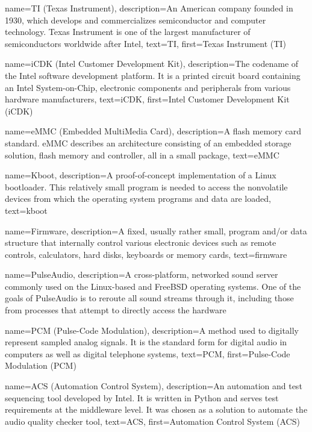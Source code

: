 {
  name=TI (Texas Instrument),
  description={An American company founded in 1930, which develops and
    commercializes semiconductor and computer technology. Texas
    Instrument is one of the largest manufacturer of semiconductors
    worldwide after Intel},
  text=TI,
  first=Texas Instrument (TI)
}

{
  name=iCDK (Intel Customer Development Kit),
  description={The codename of the Intel software development
    platform. It is a printed circuit board containing an Intel
    System-on-Chip, electronic components and peripherals from various
    hardware manufacturers},
  text=iCDK,
  first=Intel Customer Development Kit (iCDK)
}

{
  name=eMMC (Embedded MultiMedia Card),
  description={A flash memory card standard. eMMC describes an
    architecture consisting of an embedded storage solution, flash
    memory and controller, all in a small package},
  text=eMMC
}

{
  name=Kboot,
  description={A proof-of-concept implementation of a Linux
    bootloader. This relatively small program is needed to access the
    nonvolatile devices from which the operating system programs and
    data are loaded},
  text=kboot
}

{
  name=Firmware,
  description={A fixed, usually rather small, program and/or data
    structure that internally control various electronic devices such
    as remote controls, calculators, hard disks, keyboards or memory
    cards},
  text=firmware
}


{
  name=PulseAudio,
  description={A cross-platform, networked sound server commonly used
    on the Linux-based and FreeBSD operating systems. One of the goals
    of PulseAudio is to reroute all sound streams through it,
    including those from processes that attempt to directly access the
    hardware}
}

{
  name=PCM (Pulse-Code Modulation),
  description={A method used to digitally represent sampled analog
    signals. It is the standard form for digital audio in computers as
    well as digital telephone systems},
  text=PCM,
  first=Pulse-Code Modulation (PCM)
}

{
  name=ACS (Automation Control System),
  description={An automation and test sequencing tool developed by
    Intel. It is written in Python and serves test requirements at the
    middleware level. It was chosen as a solution to automate the
    audio quality checker tool},
  text=ACS,
  first=Automation Control System (ACS)
}

